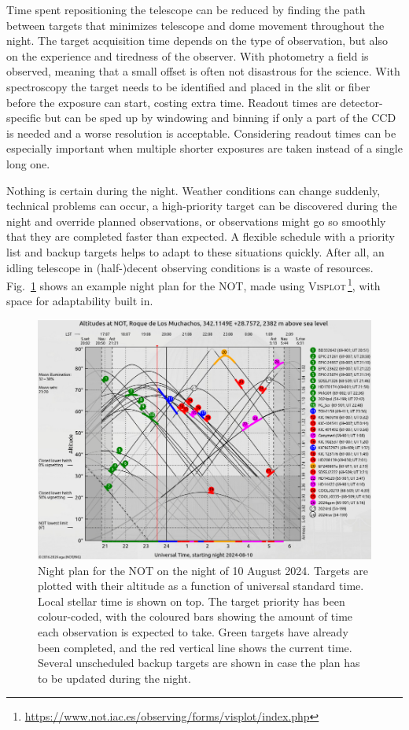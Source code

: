 \documentclass[a4paper,oneside,12pt, class=Latex/Classes/PhDthesisPSnPDF, crop=false]{standalone}
\begin{document}
Time spent repositioning the telescope can be reduced by finding the path between targets that minimizes telescope and dome movement throughout the night. The target acquisition time depends on the type of observation, but also on the experience and tiredness of the observer. With photometry a field is observed, meaning that a small offset is often not disastrous for the science. With spectroscopy the target needs to be identified and placed in the slit or fiber before the exposure can start, costing extra time. Readout times are detector-specific but can be sped up by windowing and binning if only a part of the CCD is needed and a worse resolution is acceptable. Considering readout times can be especially important when multiple shorter exposures are taken instead of a single long one.

Nothing is certain during the night. Weather conditions can change suddenly, technical problems can occur, a high-priority target can be discovered during the night and override planned observations, or observations might go so smoothly that they are completed faster than expected. A flexible schedule with a priority list and backup targets helps to adapt to these situations quickly. After all, an idling telescope in (half-)decent observing conditions is a waste of resources. Fig.~\ref{visplot} shows an example night plan for the NOT, made using \textsc{Visplot}\,\footnote{\url{https://www.not.iac.es/observing/forms/visplot/index.php}}, with space for adaptability built in.

\begin{figure}
    \centering
    \includegraphics[width=\textwidth]{../Images/chapter_2/visplot.png}
    \caption{Night plan for the NOT on the night of 10 August 2024. Targets are plotted with their altitude as a function of universal standard time. Local stellar time is shown on top. The target priority has been colour-coded, with the coloured bars showing the amount of time each observation is expected to take. Green targets have already been completed, and the red vertical line shows the current time. Several unscheduled backup targets are shown in case the plan has to be updated during the night.}
    \label{visplot}
\end{figure}
\end{document}
